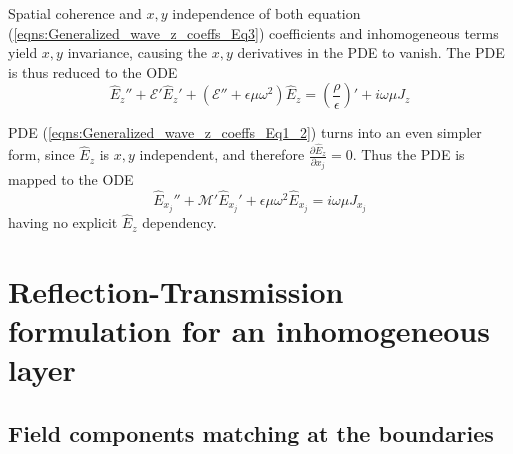 \documentclass[twocolumn,secnumarabic,amssymb, nobibnotes, aps, prd]{revtex4-1}
\begin{document}
Spatial coherence and $x,y$ independence of both equation (\ref{eqns:Generalized_wave_z_coeffs_Eq3}) coefficients and inhomogeneous terms yield $x,y$ invariance, causing the $x,y$ derivatives in the PDE  to vanish. The PDE is thus reduced to the ODE
\begin{equation}
\hat{E}_z'' + \mathcal{E}' \hat{E}_z' + \left( \mathcal{E}'' + \epsilon \mu \omega^2 \right)\hat{E}_z   = \left( \frac{\rho}{\epsilon}\right)' + i \omega \mu J_z
\label{eqns:ODE_z_inhom}
\end{equation}

PDE (\ref{eqns:Generalized_wave_z_coeffs_Eq1_2})  turns into an even simpler form, since $\hat{E}_z$ is $x,y$ independent, and therefore  $\frac{\partial \hat{E}_z}{\partial {x_j}}=0$. Thus the  PDE is mapped to the ODE  
\begin{equation}
 \hat{E}_{x_j}''+\mathcal{M}' \hat{E}_{x_j}'  +\epsilon \mu \omega^2 \hat{E}_{x_j} = i \omega\mu J_{x_j}
\label{eqns:ODE_xy_inhom}
\end{equation}
having no explicit $\hat{E}_z$ dependency.

\section{Reflection-Transmission formulation for an inhomogeneous layer}
 

\subsection{Field components matching at the boundaries}
\end{document}
